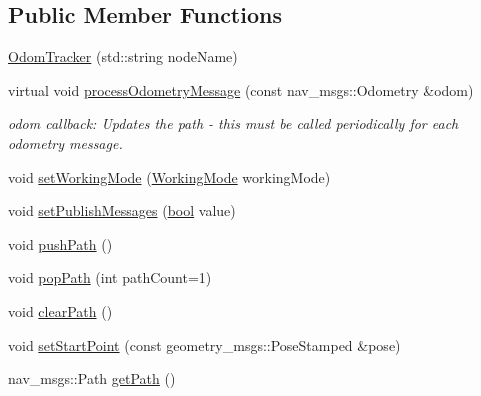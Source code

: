 \subsection*{Public Member Functions}
\begin{DoxyCompactItemize}
\item 
\hyperlink{classcl__move__base__z_1_1odom__tracker_1_1OdomTracker_ac37583fabb6d4397318b9e19598d0118}{Odom\+Tracker} (std\+::string node\+Name)
\item 
virtual void \hyperlink{classcl__move__base__z_1_1odom__tracker_1_1OdomTracker_a12c5a839cfde2e8f2f55a5e0c9647b18}{process\+Odometry\+Message} (const nav\+\_\+msgs\+::\+Odometry \&odom)
\begin{DoxyCompactList}\small\item\em odom callback\+: Updates the path -\/ this must be called periodically for each odometry message. \end{DoxyCompactList}\item 
void \hyperlink{classcl__move__base__z_1_1odom__tracker_1_1OdomTracker_aeed01bdefd9a1cc709b0b3e4eed285ed}{set\+Working\+Mode} (\hyperlink{namespacecl__move__base__z_1_1odom__tracker_ac46b05813b2791604f6cd0a39ace3ef8}{Working\+Mode} working\+Mode)
\item 
void \hyperlink{classcl__move__base__z_1_1odom__tracker_1_1OdomTracker_a3b3cf9010e4e4fe4f96cfafd5a529517}{set\+Publish\+Messages} (\hyperlink{classbool}{bool} value)
\item 
void \hyperlink{classcl__move__base__z_1_1odom__tracker_1_1OdomTracker_a205ee48ec8b4599658e7408fc4755239}{push\+Path} ()
\item 
void \hyperlink{classcl__move__base__z_1_1odom__tracker_1_1OdomTracker_a3695fc2c9b01b011638c8d58bb20a79e}{pop\+Path} (int path\+Count=1)
\item 
void \hyperlink{classcl__move__base__z_1_1odom__tracker_1_1OdomTracker_a93a14e15e3e623f530e056f403bf7644}{clear\+Path} ()
\item 
void \hyperlink{classcl__move__base__z_1_1odom__tracker_1_1OdomTracker_a9f4989c6353022c2ec3b0546c09bf3bc}{set\+Start\+Point} (const geometry\+\_\+msgs\+::\+Pose\+Stamped \&pose)
\item 
nav\+\_\+msgs\+::\+Path \hyperlink{classcl__move__base__z_1_1odom__tracker_1_1OdomTracker_a762bc88653ebb7d78e693ba465fb160f}{get\+Path} ()
\end{DoxyCompactItemize}
